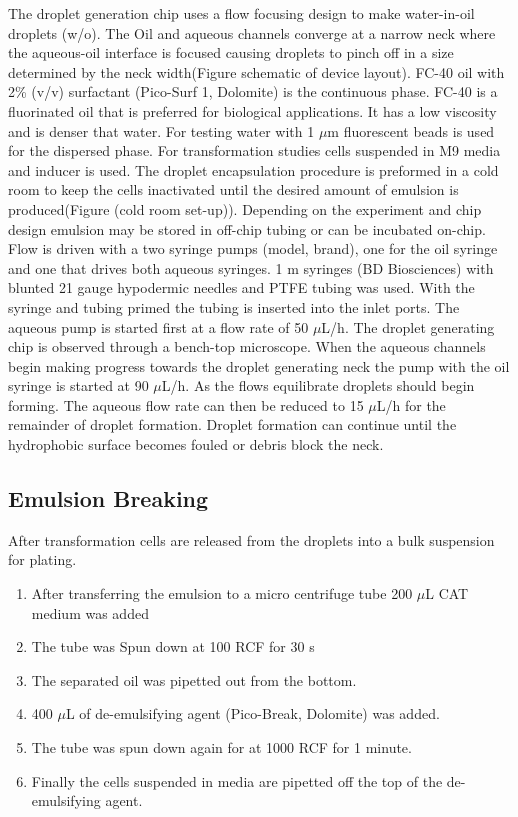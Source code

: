 The droplet generation chip uses a flow focusing design to make water-in-oil droplets (w/o).
The Oil and aqueous channels converge at a narrow neck where the aqueous-oil interface is focused causing droplets to pinch off in a size determined by the neck width(Figure schematic of device layout).
FC-40 oil with 2\% (v/v) surfactant (Pico-Surf 1, Dolomite) is the continuous phase.
FC-40 is a fluorinated oil that is preferred for biological applications.
It has a low viscosity and is denser that water.
For testing water with 1 $\mu$m fluorescent beads is used for the dispersed phase.
For transformation studies cells suspended in M9 media and inducer is used.
The droplet encapsulation procedure is preformed in a cold room to keep the cells inactivated until the desired amount of emulsion is produced(Figure (cold room set-up)).
Depending on the experiment and chip design emulsion may be stored in off-chip tubing or can be incubated on-chip.
Flow is driven with a two syringe pumps (model, brand), one for the oil syringe and one that drives both aqueous syringes.
1 m syringes (BD Biosciences) with blunted 21 gauge hypodermic needles and PTFE tubing was used.
With the syringe and tubing primed the tubing is inserted into the inlet ports.
The aqueous pump is started first at a flow rate of 50 $\mu$L/h.
The droplet generating chip is observed through a bench-top microscope.
When the aqueous channels begin making progress towards the droplet generating neck the pump with the oil syringe is started at 90 $\mu$L/h.
As the flows equilibrate droplets should begin forming.
The aqueous flow rate can then be reduced to 15 $\mu$L/h for the remainder of droplet formation.
Droplet formation can continue until the hydrophobic surface becomes fouled or debris block the neck.

\subsection{Emulsion Breaking}

After transformation cells are released from the droplets into a bulk suspension for plating.

\begin{enumerate}
	\item After transferring the emulsion to a micro centrifuge tube 200 $\mu$L CAT medium was added
	\item The tube was Spun down at 100 RCF for 30 s
	\item The separated oil was pipetted out from the bottom.
	\item 400 $\mu$L of de-emulsifying agent (Pico-Break, Dolomite) was added.
	\item The tube was spun down again for at 1000 RCF for 1 minute.
	\item Finally the cells suspended in media are pipetted off the top of the de-emulsifying agent.
\end{enumerate}


